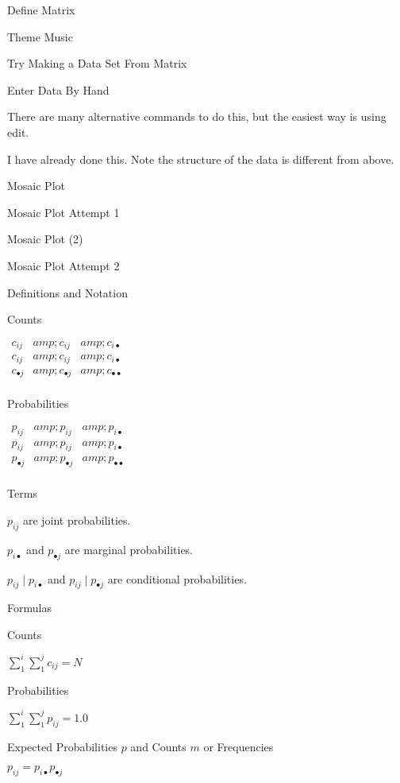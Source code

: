 \documentclass[
]{article}
\begin{document}
Define Matrix

Theme Music

Try Making a Data Set From Matrix

Enter Data By Hand

There are many alternative commands to do this, but the easiest way is using edit.

I have already done this. Note the structure of the data is different from above.

Mosaic Plot

Mosaic Plot Attempt 1

Mosaic Plot (2)

Mosaic Plot Attempt 2

Definitions and Notation

Counts

{\(\begin{matrix} c_{ij} &amp; c_{ij} &amp; c_{i\bullet} \\ c_{ij} &amp; c_{ij} &amp; c_{i\bullet} \\ c_{\bullet j} &amp; c_{\bullet j} &amp; c_{\bullet \bullet} \\ \end{matrix}\)}

Probabilities

{\(\begin{matrix}p_{ij} &amp; p_{ij} &amp; p_{i\bullet} \\ p_{ij} &amp; p_{ij} &amp; p_{i \bullet} \\ p_{\bullet j} &amp; p_{\bullet j} &amp; p_{\bullet \bullet} \\ \end{matrix}\)}

Terms

{\(p_{ij}\)} are joint probabilities.

{\(p_{i \bullet}\)} and {\(p_{\bullet j}\)} are marginal probabilities.

{\(p_{ij} \mid p_{i \bullet}\)} and {\(p_{ij} \mid p_{\bullet j}\)} are conditional probabilities.

Formulas

Counts

{\(\sum_{1}^{i} \sum_{1}^{j} c_{ij} = N\)}

Probabilities

{\(\sum_{1}^{i} \sum_{1}^{j} p_{ij} = 1.0\)}

Expected Probabilities {\(p\)} and Counts {\(m\)} or Frequencies

{\(p_{ij} = p_{i \bullet} p_{\bullet j}\)}
\end{document}
